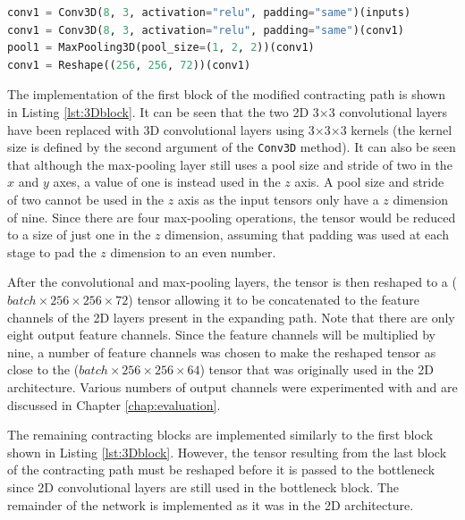 \begin{lstlisting}[float={!t},caption={The implementation of the first contracting block of the modified U-Net architecture using the Keras functional API.},label={lst:3Dblock},language=Python,upquote=true,belowskip=0pt]
conv1 = Conv3D(8, 3, activation="relu", padding="same")(inputs)
conv1 = Conv3D(8, 3, activation="relu", padding="same")(conv1)
pool1 = MaxPooling3D(pool_size=(1, 2, 2))(conv1)
conv1 = Reshape((256, 256, 72))(conv1)
\end{lstlisting}
The implementation of the first block of the modified contracting path is shown in Listing \ref{lst:3Dblock}. It can be seen that the two 2D 3$\times$3 convolutional layers have been replaced with 3D convolutional layers using 3$\times$3$\times$3 kernels (the kernel size is defined by the second argument of the \texttt{Conv3D} method). It can also be seen that although the max-pooling layer still uses a pool size and stride of two in the $x$ and $y$ axes, a value of one is instead used in the $z$ axis. A pool size and stride of two cannot be used in the $z$ axis as the input tensors only have a $z$ dimension of nine. Since there are four max-pooling operations, the tensor would be reduced to a size of just one in the $z$ dimension, assuming that padding was used at each stage to pad the $z$ dimension to an even number.

After the convolutional and max-pooling layers, the tensor is then reshaped to a ($batch \times 256 \times 256 \times 72$) tensor allowing it to be concatenated to the feature channels of the 2D layers present in the expanding path. Note that there are only eight output feature channels. Since the feature channels will be multiplied by nine, a number of feature channels was chosen to make the reshaped tensor as close to the ($batch \times 256 \times 256 \times 64$) tensor that was originally used in the 2D architecture. Various numbers of output channels were experimented with and are discussed in Chapter \ref{chap:evaluation}.

The remaining contracting blocks are implemented similarly to the first block shown in Listing \ref{lst:3Dblock}. However, the tensor resulting from the last block of the contracting path must be reshaped before it is passed to the bottleneck since 2D convolutional layers are still used in the bottleneck block. The remainder of the network is implemented as it was in the 2D architecture.

